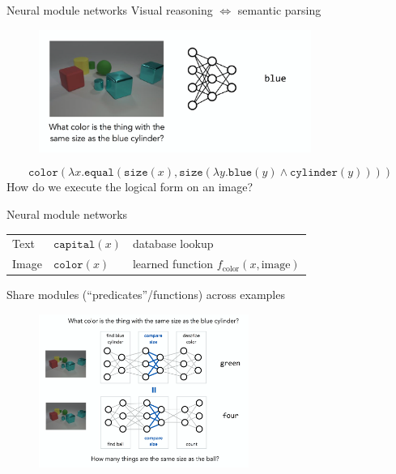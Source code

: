\documentclass[usenames,dvipsnames,notes]{beamer}
\begin{document}
\begin{frame}
    {Neural module networks}
    Visual reasoning $\iff$ semantic parsing
    \begin{figure}
        \includegraphics[height=4cm]{figures/nmn-ex}
    \end{figure}
    $$
    \texttt{color}(
    \lambda x.\texttt{equal}(
    \texttt{size}(x),
    \texttt{size}(\lambda y.\texttt{blue}(y) \land \texttt{cylinder}(y))
    )
    )
    $$
    How do we execute the logical form on an image?
\end{frame}

\begin{frame}
    {Neural module networks}
    \begin{tabular}{lll}
        Text& $\texttt{capital}(x)$ & database lookup \\
        Image& $\texttt{color}(x)$ & learned function $f_{\text{color}}(x, \text{image})$
    \end{tabular}

    Share modules (``predicates''/functions) across examples

    \vspace{-1em}
    \begin{figure}
        \includegraphics[height=5cm]{figures/nmn-ex2}
    \end{figure}
\end{frame}
\end{document}
